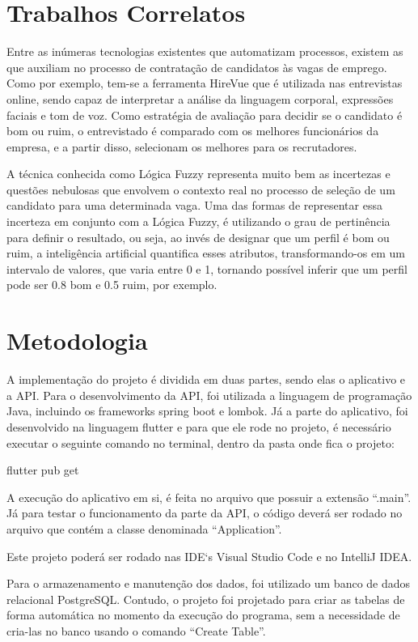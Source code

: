 \documentclass[conference]{IEEEtran}
\begin{document}
\section*{Trabalhos Correlatos}
Entre as inúmeras tecnologias existentes que automatizam processos, existem as que auxiliam no processo de contratação de candidatos às vagas de emprego. Como por exemplo, tem-se a ferramenta HireVue que é utilizada nas entrevistas online, sendo capaz de interpretar a análise da linguagem corporal, expressões faciais e tom de voz. Como estratégia de avaliação para decidir se o candidato é bom ou ruim, o entrevistado é comparado com os melhores funcionários da empresa, e a partir disso, selecionam os melhores para os recrutadores.

A técnica conhecida como Lógica Fuzzy representa muito bem as incertezas e questões nebulosas que envolvem o contexto real no processo de seleção de um candidato para uma determinada vaga. Uma das formas de representar essa incerteza em conjunto com a Lógica Fuzzy, é utilizando o grau de pertinência para definir o resultado, ou seja, ao invés de designar que um perfil é bom ou ruim, a inteligência artificial quantifica esses atributos, transformando-os em um intervalo de valores, que varia entre 0 e 1, tornando possível inferir que um perfil pode ser 0.8 bom e 0.5 ruim, por exemplo.


\section*{Metodologia}
A implementação do projeto é dividida em duas partes, sendo elas o aplicativo e a API. Para o desenvolvimento da API, foi utilizada a linguagem de programação Java, incluindo os frameworks spring boot e lombok. Já a parte do aplicativo, foi desenvolvido na linguagem flutter e para que ele rode no projeto, é necessário executar o seguinte comando no terminal, dentro da pasta onde fica o projeto:

\vspace{3mm}
\centerline{flutter pub get}
\vspace{3mm}
A execução do aplicativo em si, é feita no arquivo que possuir a extensão “.main”. Já para testar o funcionamento da parte da API, o código deverá ser rodado no arquivo que contém a classe denominada “Application”.

Este projeto poderá ser rodado nas IDE`s Visual Studio Code e no IntelliJ IDEA.

Para o armazenamento e manutenção dos dados, foi utilizado um banco de dados relacional PostgreSQL. Contudo, o projeto foi projetado para criar as tabelas de forma automática no momento da execução do programa, sem a necessidade de cria-las no banco usando o comando “Create Table”. 
\end{document}
